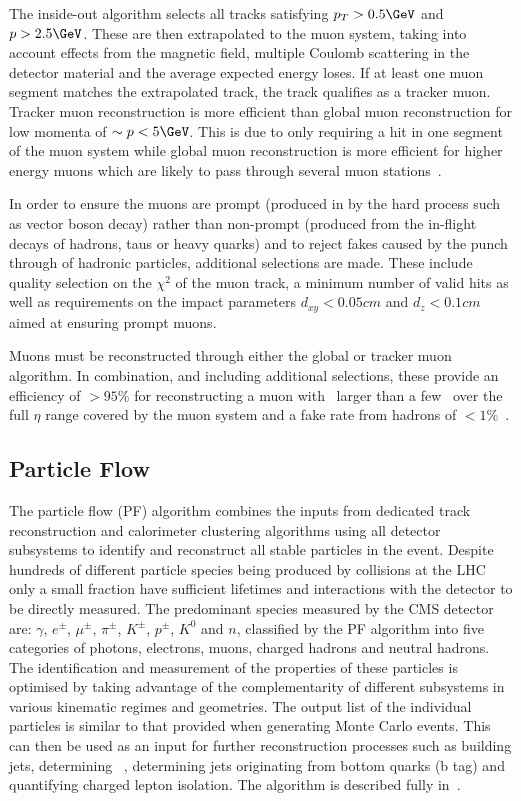 The inside-out algorithm selects all tracks satisfying $p_T > 0.5\GeV$ and $p > 2.5\GeV$. These are then 
extrapolated to the muon system, taking into account effects from the magnetic field, multiple Coulomb scattering
in the detector material and the average expected energy loses. If at least one muon segment matches 
the extrapolated track, the track qualifies as a tracker muon. Tracker muon reconstruction is more efficient
than global muon reconstruction for low momenta of $\sim p< 5\GeV$. This is due
to only requiring a hit in one segment of the muon system while global muon reconstruction is 
more efficient for higher energy muons which are likely to pass through several muon stations~\cite{muon_reco}.

In order to ensure the muons are prompt (produced in by the hard process such as vector boson decay) rather
than non-prompt (produced from the in-flight decays of hadrons, taus or heavy quarks) and to reject fakes
caused by the punch through of hadronic particles, additional selections are made. These include quality
selection on the $\chi^2$ of the muon track, a minimum number of valid hits as well as requirements
on the impact parameters $d_{xy} < 0.05 cm$ and $d_{z} < 0.1 cm$ aimed at ensuring prompt muons.

Muons must be reconstructed through either the global or tracker muon algorithm. In combination, and
including additional selections, these provide an efficiency of $>95\%$ for reconstructing a muon 
with \pt~larger than a few \GeV~over the full $\eta$ range covered by the
muon system and a fake rate from hadrons of $<1\%$~\cite{muon_reco}.

\subsection{Particle Flow}
\label{sec:particle_flow}
The particle flow (PF) algorithm combines the inputs from dedicated track reconstruction and calorimeter clustering
algorithms using all detector subsystems to identify and reconstruct all stable particles in the event.
Despite hundreds of different particle species being produced by collisions at the LHC only a small fraction
have sufficient lifetimes and interactions with the detector to be directly measured. The predominant species
measured by the CMS detector are: $\gamma$, $e^{\pm}$, $\mu^{\pm}$, $\pi^{\pm}$, $K^{\pm}$, $p^{\pm}$, $K^{0}$
and $n$, classified by the PF algorithm into five categories of photons, electrons, muons, charged hadrons and neutral hadrons. 
The identification and measurement of the properties of these particles is optimised by taking advantage of the complementarity of 
different subsystems in various kinematic regimes and geometries. The output list of the individual particles is similar to that provided
when generating Monte Carlo events. This can then be used as an input for further reconstruction processes
such as building jets, determining \met~, determining jets originating from bottom quarks (b tag) and quantifying
charged lepton isolation. The algorithm is described fully in~\cite{pf_proc,pf_pas}.

